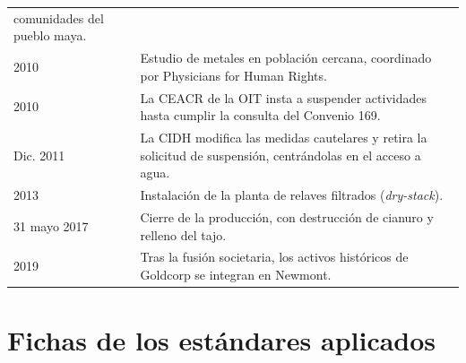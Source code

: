 \begin{footnotesize}
\begin{longtable}{@{}L{2.6cm} L{12.2cm}@{}}
                 comunidades del pueblo maya. \\
  2010         & Estudio de metales en población cercana, coordinado por
                 Physicians for Human Rights. \\
  2010         & La {CEACR} de la {OIT} insta a suspender actividades hasta
                 cumplir la consulta del Convenio 169. \\
  Dic. 2011    & La {CIDH} modifica las medidas cautelares y retira la solicitud
                 de suspensión, centrándolas en el acceso a agua. \\
  2013         & Instalación de la planta de relaves filtrados (\textit{dry-stack}). \\
  31 mayo 2017 & Cierre de la producción, con destrucción de cianuro y relleno
                 del tajo. \\
  2019         & Tras la fusión societaria, los activos históricos de Goldcorp se
                 integran en Newmont. \\

\end{longtable}
\end{footnotesize}

\section{Fichas de los estándares aplicados}
\label{anexo:estandares}

